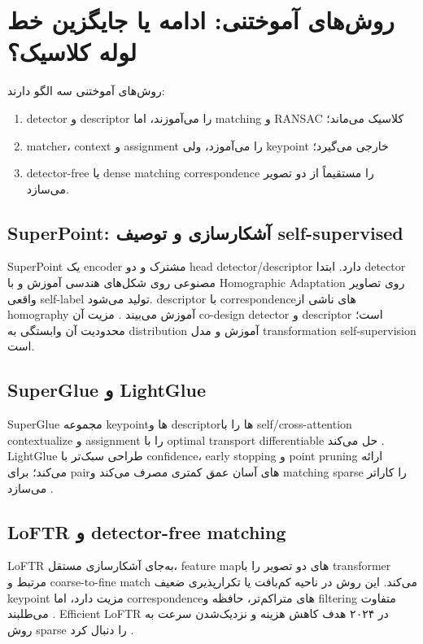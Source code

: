 \documentclass[12pt,openany,oneside]{book}
\begin{document}
\section{روش‌های آموختنی: ادامه یا جایگزین خط لوله کلاسیک؟}
روش‌های آموختنی سه الگو دارند:
\begin{enumerate}
\item detector و descriptor را می‌آموزند، اما matching و RANSAC کلاسیک می‌ماند؛
\item matcher، context و assignment را می‌آموزد، ولی keypoint خارجی می‌گیرد؛
\item detector-free یا dense matching correspondence را مستقیماً از دو تصویر می‌سازد.
\end{enumerate}

\subsection{SuperPoint: آشکارسازی و توصیف self-supervised}
SuperPoint یک encoder مشترک و دو head detector/descriptor دارد. ابتدا detector مصنوعی روی شکل‌های هندسی آموزش و با Homographic Adaptation روی تصاویر واقعی self-label تولید می‌شود. descriptor با correspondenceهای ناشی از homography آموزش می‌بیند \cite{detone2018}. مزیت آن co-design detector و descriptor است؛ محدودیت آن وابستگی به distribution آموزش و مدل transformation self-supervision است.

\subsection{SuperGlue و LightGlue}
SuperGlue مجموعه keypointها و descriptorها را با self/cross-attention contextualize و assignment را با optimal transport differentiable حل می‌کند \cite{sarlin2020}. LightGlue طراحی سبک‌تر با confidence، early stopping و point pruning ارائه می‌کند؛ برای pairهای آسان عمق کمتری مصرف می‌کند و matching sparse را کاراتر می‌سازد \cite{lindenberger2023}.

\subsection{LoFTR و detector-free matching}
LoFTR به‌جای آشکارسازی مستقل، feature mapهای دو تصویر را با transformer مرتبط و coarse-to-fine match می‌کند. این روش در ناحیه کم‌بافت یا تکرارپذیری ضعیف keypoint مزیت دارد، اما correspondenceهای متراکم‌تر، حافظه و filtering متفاوت می‌طلبند \cite{sun2021}. Efficient LoFTR در ۲۰۲۴ هدف کاهش هزینه و نزدیک‌شدن سرعت به روش sparse را دنبال کرد \cite{wang2024loftr}.
\end{document}
